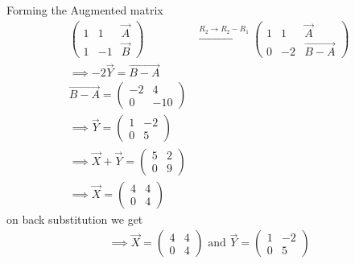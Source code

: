 \documentclass[journal]{IEEEtran}
\begin{document}
Forming the Augmented matrix
\begin{align}
\left(\begin{array}{cc|c}
1 & 1 & \vec{A}\\
1 & -1 & \vec{B}
\end{array}\right)  &\xrightarrow{R_2 \rightarrow R_2-R_1} \left(\begin{array}{cc|c}
1 & 1 & \vec{A}\\
0 & -2 & \vec{B-A}
\end{array}\right)\\
\implies -2\Vec{Y}=\vec{B-A}\\
\vec{B-A}= \begin{pmatrix}
    -2 & 4\\
    0 & -10
\end{pmatrix}\\
\implies \Vec{Y}=\begin{pmatrix} 1 & -2 \\ 0 & 5 \end{pmatrix}\\
\implies \Vec{X}+\Vec{Y}=\begin{pmatrix} 5 & 2 \\ 0 & 9 \end{pmatrix}\\
\implies \Vec{X}=\begin{pmatrix} 4 & 4 \\ 0 & 4 \end{pmatrix}
\end{align}
on back substitution we get
\begin{align}
    \implies \Vec{X}=\begin{pmatrix} 4 & 4 \\ 0 & 4 \end{pmatrix} \text{ and }
    \Vec{Y}=\begin{pmatrix} 1 & -2 \\ 0 & 5 \end{pmatrix}
\end{align}
\end{document}

